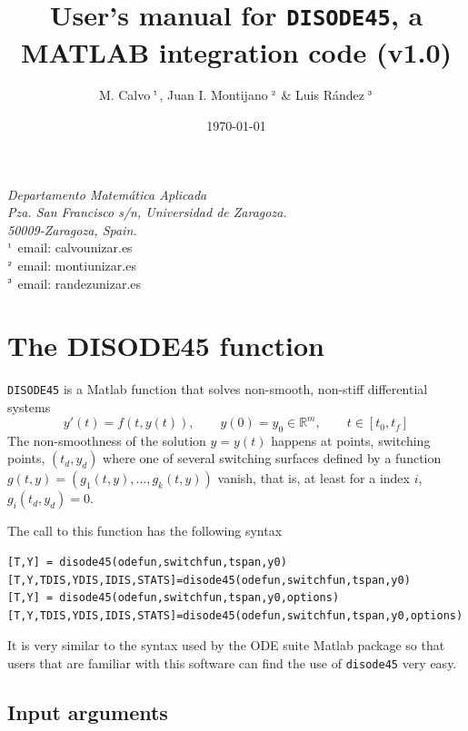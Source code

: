 \documentclass{article}
\title{User's manual for \texttt{DISODE45}, a MATLAB integration code (v1.0)}
\author{M. Calvo$^{\mbox{\tiny {
1}}}$, Juan I. Montijano$^{\mbox{\tiny {
2}}}$ \& Luis R\'{a}ndez$^{\mbox{\tiny {
3}}}$}
\date{\today}
\begin{document}
\maketitle

\begin{center}
{ \footnotesize\em Departamento  Matem\'{a}tica Aplicada\\
Pza. San Francisco s/n,
Universidad de Zaragoza.\\
50009-Zaragoza, Spain.}
\\[3pt]
 \footnotesize $^{\mbox{\tiny\rm 1}}$
email: calvounizar.es
\\
 \footnotesize $^{\mbox{\tiny\rm 2}}$
 email: montiunizar.es
\\
 \footnotesize $^{\mbox{\tiny\rm 3}}$
email: randezunizar.es
\end{center}


\section{The DISODE45 function}
\texttt{DISODE45}  is a Matlab function that
solves non-smooth, non-stiff differential systems
\[
y'(t)=f(t,y(t)), \qquad  y(0)=y_0 \in \mathbb{R}^m, \qquad  t\in[t_0, t_f]
\]
The non-smoothness of the solution $y=y(t)$ happens at points, switching points, $(t_d, y_d)$ where  one
of several switching surfaces defined by a function $g(t,y)=(g_1(t,y), \ldots, g_k(t,y))$ vanish, that is,
at least for a index $i$, $g_i(t_d,y_d)=0$.

The call to this function has the following syntax

\begin{verbatim}
[T,Y] = disode45(odefun,switchfun,tspan,y0)
[T,Y,TDIS,YDIS,IDIS,STATS]=disode45(odefun,switchfun,tspan,y0)
[T,Y] = disode45(odefun,switchfun,tspan,y0,options)
[T,Y,TDIS,YDIS,IDIS,STATS]=disode45(odefun,switchfun,tspan,y0,options)
\end{verbatim}

It is very similar to the syntax used by the ODE suite Matlab package so that
users that are familiar with this software can find the use of
\texttt{disode45} very easy.

\medskip

\subsection{Input arguments}
\end{document}
